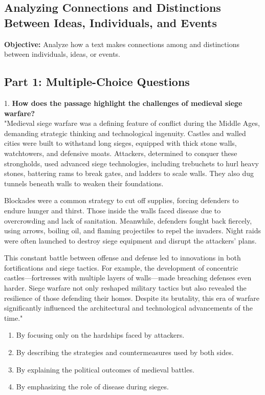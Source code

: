 \documentclass[12pt]{article}
\begin{document}
\subsection*{Analyzing Connections and Distinctions Between Ideas, Individuals, and Events}
\onehalfspacing

\begin{tcolorbox}[colframe=black!40, colback=gray!0, title=Learning Objective]
\textbf{Objective:} Analyze how a text makes connections among and distinctions between individuals, ideas, or events.
\end{tcolorbox}

\subsection*{Part 1: Multiple-Choice Questions}

1. \textbf{How does the passage highlight the challenges of medieval siege warfare?}\\
"Medieval siege warfare was a defining feature of conflict during the Middle Ages, demanding strategic thinking and technological ingenuity. Castles and walled cities were built to withstand long sieges, equipped with thick stone walls, watchtowers, and defensive moats. Attackers, determined to conquer these strongholds, used advanced siege technologies, including trebuchets to hurl heavy stones, battering rams to break gates, and ladders to scale walls. They also dug tunnels beneath walls to weaken their foundations.

Blockades were a common strategy to cut off supplies, forcing defenders to endure hunger and thirst. Those inside the walls faced disease due to overcrowding and lack of sanitation. Meanwhile, defenders fought back fiercely, using arrows, boiling oil, and flaming projectiles to repel the invaders. Night raids were often launched to destroy siege equipment and disrupt the attackers’ plans.

This constant battle between offense and defense led to innovations in both \\fortifications and siege tactics. For example, the development of concentric \\castles—fortresses with multiple layers of walls—made breaching defenses even harder. Siege warfare not only reshaped military tactics but also revealed the \\resilience of those defending their homes. Despite its brutality, this era of warfare significantly influenced the architectural and technological advancements of the time."\\  
\begin{enumerate}[label=\Alph*.]
    \item By focusing only on the hardships faced by attackers.  
    \item By describing the strategies and countermeasures used by both sides.  
    \item By explaining the political outcomes of medieval battles.  
    \item By emphasizing the role of disease during sieges.  
\end{enumerate}
\end{document}
